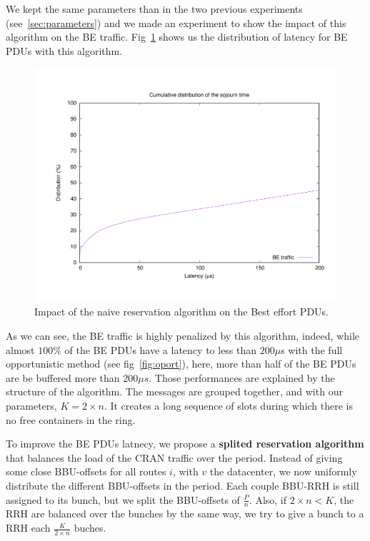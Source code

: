 \documentclass[]{algotel}
\begin{document}
We kept the same parameters than in the two previous experiments (see~\ref{sec:parameters}) and we made an experiment to show the impact of this algorithm on the BE traffic. Fig~\ref{fig:res1} shows us the distribution of latency for BE PDUs with this algorithm.

      \begin{figure}[h]
\centering
      \includegraphics[scale=0.4]{res1.pdf}
     \caption{Impact of the naive reservation algorithm on the Best effort PDUs.}   \label{fig:res1}
  \end{figure}

As we can see, the BE traffic is highly penalized by this algorithm, indeed, while almost $100\%$ of the BE PDUs have a latency to less than $200 \mu$s with the full opportunistic method (see fig~\ref{fig:oport}), here, more than half of the BE PDUs are be buffered more than $200\mu s$. Those performances are explained by the structure of the algorithm. The messages are grouped together, and with our parameters, $K = 2\times n$. It creates a long sequence of slots during which there is no free containers in the ring. 

To improve the BE PDUs latnecy, we propose a {\bf splited reservation algorithm} that balances the load of the CRAN traffic over the period. Instead of giving some close BBU-offsets for all routes $i$, with $v$ the datacenter, we now uniformly distribute the different BBU-offsets in the period. Each couple BBU-RRH is still assigned to its bunch, but we split the BBU-offsets of $\frac{P}{n}$. Also, if $2 \times n < K$, the RRH are balanced over the bunches by the same way, we try to give a bunch to a RRH each $\frac{K}{2\times n}$ buches.
\end{document}
